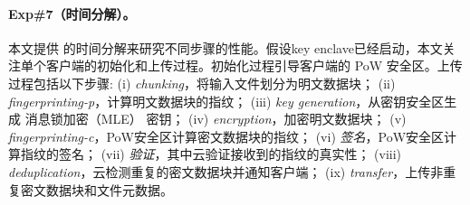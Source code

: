 \paragraph*{Exp\#7（时间分解）。} 本文提供 \sysnameS 的时间分解来研究不同步骤的性能。假设key enclave已经启动，本文关注单个客户端的初始化和上传过程。初始化过程引导客户端的 PoW 安全区。上传过程包括以下步骤: (i) \textit{ chunking}，将输入文件划分为明文数据块； (ii) \textit{ fingerprinting-p}，计算明文数据块的指纹； (iii) \textit{ key generation}，从密钥安全区生成 消息锁加密（MLE） 密钥； (iv) \textit{ encryption}，加密明文数据块； (v) \textit{ fingerprinting-c}，PoW安全区计算密文数据块的指纹； (vi) \textit{ 签名}，PoW安全区计算指纹的签名； (vii) \textit{ 验证}，其中云验证接收到的指纹的真实性； (viii) \textit{ deduplication}，云检测重复的密文数据块并通知客户端； (ix) \textit{ transfer}，上传非重复密文数据块和文件元数据。



